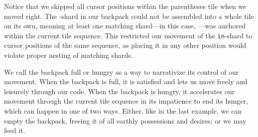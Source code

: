 

Notice that we skipped all cursor positions within
the parentheses tile when we moved right.
The -shard in our backpack could not be assembled into
a whole tile on its own, meaning at least one matching shard---in
this case, ---was
anchored within the current tile sequence.
This restricted our movement of the \texttt{in}-shard
to cursor positions of the same sequence,
as placing it in any other position would
violate proper nesting of matching shards.


We call the backpack full or hungry as a way
to narrativize its control of our movement.
When the backpack is full, it is satisfied
and lets us move freely and leisurely through
our code.
When the backpack is hungry, it accelerates our
movement through the current tile sequence
in its impatience to end its hunger, which can happen in one of two ways.
Either, like in the last example, we can empty the backpack,
freeing it of all earthly possessions and desires;
or we may feed it.




